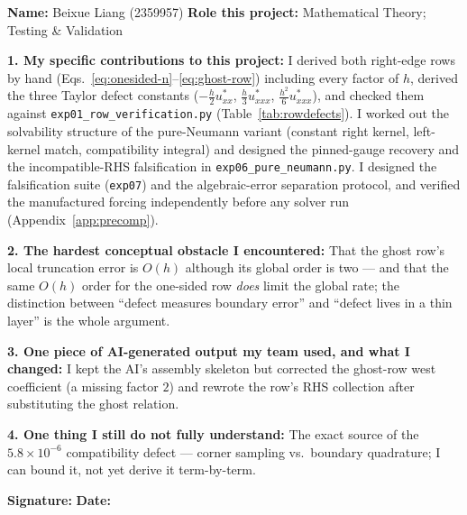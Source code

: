 \documentclass[11pt,a4paper]{article}
\begin{document}
\begin{formbox}
\textbf{Name:} Beixue Liang (2359957)
\textbf{Role this project:} Mathematical Theory; Testing \& Validation

\textbf{1. My specific contributions to this project:}
I derived both right-edge rows by hand
(Eqs.~\eqref{eq:onesided-n}--\eqref{eq:ghost-row}) including every
factor of $h$, derived the three Taylor defect constants
($-\frac{h}{2}u^*_{xx}$, $\frac{h}{3}u^*_{xxx}$,
$\frac{h^2}{6}u^*_{xxx}$), and checked them against
\texttt{exp01\_row\_verification.py} (Table~\ref{tab:rowdefects}).  I
worked out the solvability structure of the pure-Neumann variant
(constant right kernel, left-kernel match, compatibility integral) and
designed the pinned-gauge recovery and the incompatible-RHS
falsification in \texttt{exp06\_pure\_neumann.py}.  I designed the
falsification suite (\texttt{exp07}) and the algebraic-error separation
protocol, and verified the manufactured forcing independently before any
solver run (Appendix~\ref{app:precomp}).

\textbf{2. The hardest conceptual obstacle I encountered:}
That the ghost row's local truncation error is $O(h)$ although its
global order is two --- and that the same $O(h)$ order for the one-sided
row \emph{does} limit the global rate; the distinction between ``defect
measures boundary error'' and ``defect lives in a thin layer'' is the
whole argument.

\textbf{3. One piece of AI-generated output my team used, and what I
changed:}
I kept the AI's assembly skeleton but corrected the ghost-row west
coefficient (a missing factor $2$) and rewrote the row's RHS collection
after substituting the ghost relation.

\textbf{4. One thing I still do not fully understand:}
The exact source of the $5.8\times10^{-6}$ compatibility defect ---
corner sampling vs.\ boundary quadrature; I can bound it, not yet derive
it term-by-term.

\textbf{Signature:} \underline{\hspace{4cm}} \quad \textbf{Date:}
\underline{\hspace{2cm}}
\end{formbox}
\end{document}
